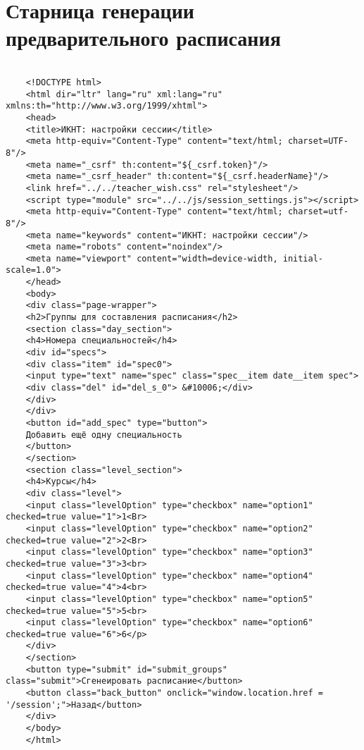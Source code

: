 \chapter{Старница генерации предварительного расписания}\label{appendix-result}	

\begin{lstlisting}
	
	<!DOCTYPE html>
	<html dir="ltr" lang="ru" xml:lang="ru" xmlns:th="http://www.w3.org/1999/xhtml">
	<head>
	<title>ИКНТ: настройки сессии</title>
	<meta http-equiv="Content-Type" content="text/html; charset=UTF-8"/>
	<meta name="_csrf" th:content="${_csrf.token}"/>
	<meta name="_csrf_header" th:content="${_csrf.headerName}"/>
	<link href="../../teacher_wish.css" rel="stylesheet"/>
	<script type="module" src="../../js/session_settings.js"></script>
	<meta http-equiv="Content-Type" content="text/html; charset=utf-8"/>
	<meta name="keywords" content="ИКНТ: настройки сессии"/>
	<meta name="robots" content="noindex"/>
	<meta name="viewport" content="width=device-width, initial-scale=1.0">
	</head>
	<body>
	<div class="page-wrapper">
	<h2>Группы для составления расписания</h2>
	<section class="day_section">
	<h4>Номера специальностей</h4>
	<div id="specs">
	<div class="item" id="spec0">
	<input type="text" name="spec" class="spec__item date__item spec">
	<div class="del" id="del_s_0"> &#10006;</div>
	</div>
	</div>
	<button id="add_spec" type="button">
	Добавить ещё одну специальность
	</button>
	</section>
	<section class="level_section">
	<h4>Курсы</h4>
	<div class="level">
	<input class="levelOption" type="checkbox" name="option1" checked=true value="1">1<Br>
	<input class="levelOption" type="checkbox" name="option2" checked=true value="2">2<Br>
	<input class="levelOption" type="checkbox" name="option3" checked=true value="3">3<br>
	<input class="levelOption" type="checkbox" name="option4" checked=true value="4">4<br>
	<input class="levelOption" type="checkbox" name="option5" checked=true value="5">5<br>
	<input class="levelOption" type="checkbox" name="option6" checked=true value="6">6</p>
	</div>
	</section>
	<button type="submit" id="submit_groups" class="submit">Сгенеировать расписание</button>
	<button class="back_button" onclick="window.location.href = '/session';">Назад</button>
	</div>
	</body>
	</html>
	
\end{lstlisting}